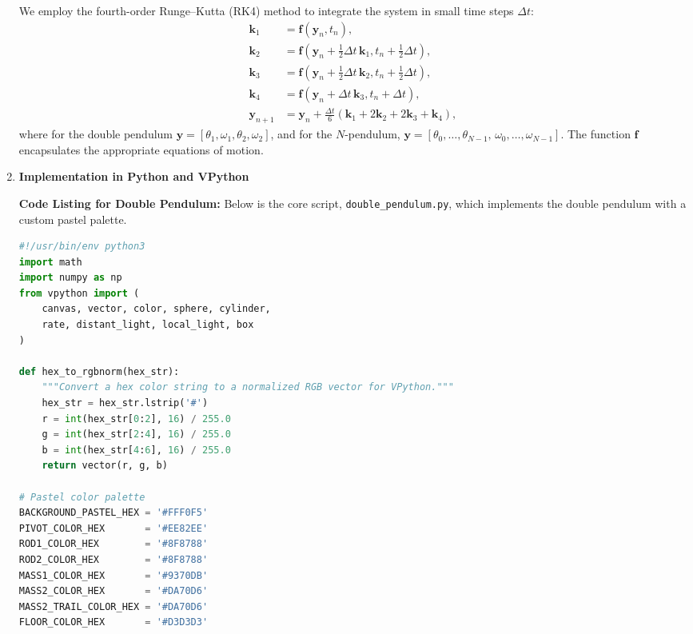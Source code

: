 \documentclass[letterpaper,12pt]{article}
\begin{document}
\begin{enumerate}[leftmargin=*, itemsep=1em]
We employ the fourth-order Runge–Kutta (RK4) method to integrate the system in small time steps $\Delta t$:
\[
\begin{aligned}
\mathbf{k}_1 &= \mathbf{f}(\mathbf{y}_n, t_n), \\
\mathbf{k}_2 &= \mathbf{f}(\mathbf{y}_n + \tfrac{1}{2}\Delta t\,\mathbf{k}_1, t_n + \tfrac{1}{2}\Delta t), \\
\mathbf{k}_3 &= \mathbf{f}(\mathbf{y}_n + \tfrac{1}{2}\Delta t\,\mathbf{k}_2, t_n + \tfrac{1}{2}\Delta t), \\
\mathbf{k}_4 &= \mathbf{f}(\mathbf{y}_n + \Delta t\,\mathbf{k}_3, t_n + \Delta t), \\
\mathbf{y}_{n+1} &= \mathbf{y}_n + \frac{\Delta t}{6}(\mathbf{k}_1 + 2\mathbf{k}_2 + 2\mathbf{k}_3 + \mathbf{k}_4),
\end{aligned}
\]
where for the double pendulum $\mathbf{y} = [\theta_1, \omega_1, \theta_2, \omega_2]$, and for the $N$-pendulum, $\mathbf{y} = [\theta_0,\dots,\theta_{N-1},\,\omega_0,\dots,\omega_{N-1}]$. The function $\mathbf{f}$ encapsulates the appropriate equations of motion.

\item \textbf{Implementation in Python and VPython}
\label{sec:implementation}

\textbf{Code Listing for Double Pendulum:} Below is the core script,
\texttt{double\_pendulum.py},
which implements the double pendulum with a custom pastel palette.

\begin{lstlisting}[language=Python, caption=Double Pendulum Simulation (double\_pendulum.py), label=lst:doublependulum]
#!/usr/bin/env python3
import math
import numpy as np
from vpython import (
    canvas, vector, color, sphere, cylinder,
    rate, distant_light, local_light, box
)

def hex_to_rgbnorm(hex_str):
    """Convert a hex color string to a normalized RGB vector for VPython."""
    hex_str = hex_str.lstrip('#')
    r = int(hex_str[0:2], 16) / 255.0
    g = int(hex_str[2:4], 16) / 255.0
    b = int(hex_str[4:6], 16) / 255.0
    return vector(r, g, b)

# Pastel color palette
BACKGROUND_PASTEL_HEX = '#FFF0F5'
PIVOT_COLOR_HEX       = '#EE82EE'
ROD1_COLOR_HEX        = '#8F8788'
ROD2_COLOR_HEX        = '#8F8788'
MASS1_COLOR_HEX       = '#9370DB'
MASS2_COLOR_HEX       = '#DA70D6'
MASS2_TRAIL_COLOR_HEX = '#DA70D6'
FLOOR_COLOR_HEX       = '#D3D3D3'


\end{lstlisting}
\end{enumerate}
\end{document}
